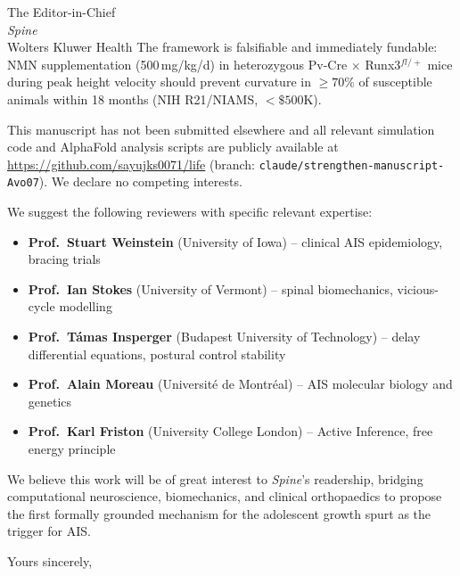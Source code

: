 \documentclass[12pt]{letter}
\begin{document}
\begin{letter}{The Editor-in-Chief\\\textit{Spine}\\Wolters Kluwer Health}
The framework is falsifiable and immediately fundable: NMN supplementation
(500\,mg/kg/d) in heterozygous Pv-Cre $\times$ Runx3$^{fl/+}$ mice during
peak height velocity should prevent curvature in $\geq70\%$ of susceptible
animals within 18 months (NIH R21/NIAMS, $<\$500$K).

This manuscript has not been submitted elsewhere and all relevant simulation
code and AlphaFold analysis scripts are publicly available at
\url{https://github.com/sayujks0071/life} (branch:
\texttt{claude/strengthen-manuscript-Avo07}). We declare no competing interests.

We suggest the following reviewers with specific relevant expertise:

\begin{itemize}
  \item \textbf{Prof.\ Stuart Weinstein} (University of Iowa) --
    clinical AIS epidemiology, bracing trials
  \item \textbf{Prof.\ Ian Stokes} (University of Vermont) --
    spinal biomechanics, vicious-cycle modelling
  \item \textbf{Prof.\ T\'{a}mas Insperger} (Budapest University of
    Technology) -- delay differential equations, postural control stability
  \item \textbf{Prof.\ Alain Moreau} (Universit\'{e} de Montr\'{e}al) --
    AIS molecular biology and genetics
  \item \textbf{Prof.\ Karl Friston} (University College London) --
    Active Inference, free energy principle
\end{itemize}

We believe this work will be of great interest to \textit{Spine}'s readership,
bridging computational neuroscience, biomechanics, and clinical orthopaedics
to propose the first formally grounded mechanism for the adolescent growth
spurt as the trigger for AIS.

\closing{Yours sincerely,}

\end{letter}
\end{document}
